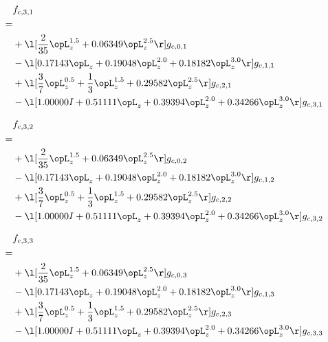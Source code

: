 \begin{alignat}{2} 
\label{eq:f_31_0} 
& f_{c,3,1} \nonumber \\ 
 = \\ 
& + \l[ \frac{2}{35} \opL_z^{1.5} +  0.06349 \opL_z^{2.5}  \r] g_{c,0,1} \nonumber \\ 
& - \l[  0.17143 \opL_z +  0.19048 \opL_z^{2.0} +  0.18182 \opL_z^{3.0}  \r] g_{c,1,1} \nonumber \\ 
& + \l[ \frac{3}{7} \opL_z^{0.5} + \frac{1}{3} \opL_z^{1.5} +  0.29582 \opL_z^{2.5}  \r] g_{c,2,1} \nonumber \\ 
& - \l[  1.00000 I +  0.51111 \opL_z +  0.39394 \opL_z^{2.0} +  0.34266 \opL_z^{3.0}  \r] g_{c,3,1} \nonumber \\ 
\end{alignat} 


\begin{alignat}{2} 
\label{eq:f_32_0} 
& f_{c,3,2} \nonumber \\ 
 = \\ 
& + \l[ \frac{2}{35} \opL_z^{1.5} +  0.06349 \opL_z^{2.5}  \r] g_{c,0,2} \nonumber \\ 
& - \l[  0.17143 \opL_z +  0.19048 \opL_z^{2.0} +  0.18182 \opL_z^{3.0}  \r] g_{c,1,2} \nonumber \\ 
& + \l[ \frac{3}{7} \opL_z^{0.5} + \frac{1}{3} \opL_z^{1.5} +  0.29582 \opL_z^{2.5}  \r] g_{c,2,2} \nonumber \\ 
& - \l[  1.00000 I +  0.51111 \opL_z +  0.39394 \opL_z^{2.0} +  0.34266 \opL_z^{3.0}  \r] g_{c,3,2} \nonumber \\ 
\end{alignat} 


\begin{alignat}{2} 
\label{eq:f_33_0} 
& f_{c,3,3} \nonumber \\ 
 = \\ 
& + \l[ \frac{2}{35} \opL_z^{1.5} +  0.06349 \opL_z^{2.5}  \r] g_{c,0,3} \nonumber \\ 
& - \l[  0.17143 \opL_z +  0.19048 \opL_z^{2.0} +  0.18182 \opL_z^{3.0}  \r] g_{c,1,3} \nonumber \\ 
& + \l[ \frac{3}{7} \opL_z^{0.5} + \frac{1}{3} \opL_z^{1.5} +  0.29582 \opL_z^{2.5}  \r] g_{c,2,3} \nonumber \\ 
& - \l[  1.00000 I +  0.51111 \opL_z +  0.39394 \opL_z^{2.0} +  0.34266 \opL_z^{3.0}  \r] g_{c,3,3} \nonumber \\ 
\end{alignat} 


